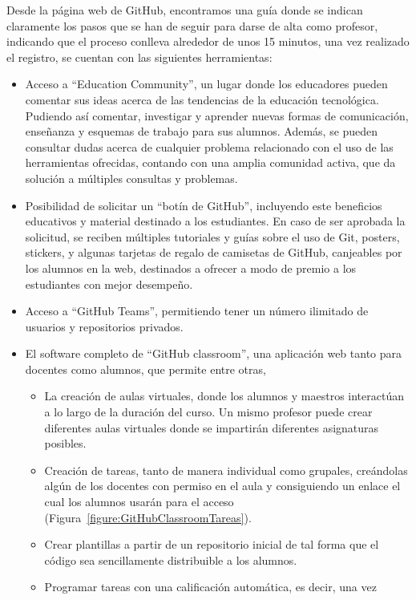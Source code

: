 Desde la página web de GitHub, encontramos una guía donde se indican
claramente los pasos que se han de seguir para darse de alta como profesor,
indicando que el proceso conlleva alrededor de unos 15 minutos, una vez
realizado el registro, se cuentan con las siguientes herramientas:

\begin{itemize}
\item Acceso a ``Education Community'', un lugar donde los educadores
  pueden comentar sus ideas acerca de las tendencias de la educación
  tecnológica. Pudiendo así comentar, investigar y aprender nuevas formas
  de comunicación, enseñanza y esquemas de trabajo para sus alumnos.
  Además, se pueden consultar dudas acerca de cualquier problema
  relacionado con el uso de las herramientas ofrecidas, contando con una
  amplia comunidad activa, que da solución a múltiples consultas y
  problemas.
\item Posibilidad de solicitar un ``botín de GitHub'', incluyendo este
  beneficios educativos y material destinado a los estudiantes. En caso de
  ser aprobada la solicitud, se reciben múltiples tutoriales y guías sobre
  el uso de Git, posters, stickers, y algunas tarjetas de regalo de
  camisetas de GitHub, canjeables por los alumnos en la web, destinados a
  ofrecer a modo de premio a los estudiantes con mejor desempeño.
\item Acceso a ``GitHub Teams'', permitiendo tener un número ilimitado de
  usuarios y repositorios privados.
\item El software completo de “GitHub classroom”, una aplicación web tanto
  para docentes como alumnos, que permite entre otras,
  \begin{itemize}
  \item La creación de aulas virtuales, donde los alumnos y maestros
    interactúan a lo largo de la duración del curso. Un mismo profesor
    puede crear diferentes aulas virtuales donde se impartirán diferentes
    asignaturas posibles.
  \item Creación de tareas, tanto de manera
    individual como grupales, creándolas algún de los docentes con permiso
    en el aula y consiguiendo un enlace el cual los alumnos usarán para el
    acceso (Figura~\ref{figure:GitHubClassroomTareas}).
  \item Crear plantillas a partir de un repositorio inicial de tal forma
    que el código sea sencillamente distribuible a los alumnos.
  \item Programar tareas con una calificación automática, es decir, una vez

\end{itemize}
\end{itemize}
